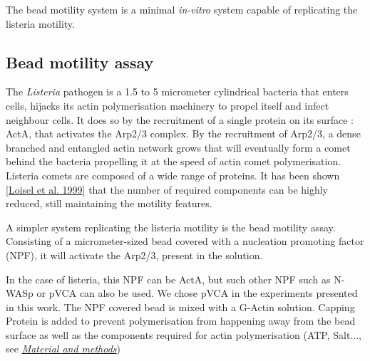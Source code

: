 \documentclass[A4paperpaper,11pt,english]{sphinxmanual}
\begin{document}
The bead motility system is a minimal \emph{in-vitro} system capable of replicating
the listeria motility.


\subsection{Bead motility assay}
\label{index-latex:id49}\label{index-latex:bead-motility-assay}
The \emph{Listeria} pathogen is a 1.5 to 5 micrometer cylindrical bacteria that
enters cells, hijacks its actin polymerisation machinery to propel itself and
infect neighbour cells. It does so by the recruitment of a single protein on its
surface : ActA, that activates the Arp2/3 complex. By the recruitment of Arp2/3, a
dense branched and entangled actin network grows that will eventually form a
comet behind the bacteria propelling it at the speed of actin comet
polymerisation. Listeria comets are composed of a wide range of proteins. It has
been shown {\hyperref[index-latex:loisel1999]{{[}Loisel et al. 1999{]}}} that the number of required components can
be highly reduced, still maintaining the motility features.

A simpler system replicating the listeria motility is the bead motility assay.
Consisting of a micrometer-sized bead covered with a nucleation promoting factor (NPF), it will activate the Arp2/3, present in the solution.

In the case of listeria, this NPF can be ActA, but such other NPF such as N-WASp or pVCA can also be used.
We chose pVCA in the experiments presented in this work. The NPF covered
bead is mixed with a G-Actin solution. Capping Protein is added to prevent
polymerisation from happening away from the bead surface as well as the
components required for actin polymerisation (ATP, Salt..., see {\hyperref[index-latex:m-et-m]{\emph{Material and methods}}})
\end{document}
